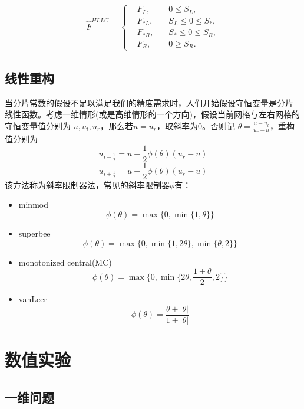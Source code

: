 \documentclass[a4paper,  11pt]{ctexart}
\begin{document}
\begin{itemize}
    \begin{align*}
      \hat{F}^{HLLC}=\left\{
      \begin{aligned}
        &F_L,\quad &0\leq S_L, \\
        &F_{*L},\quad &S_L\leq 0 \leq S_*,\\
        &F_{*R},\quad &S_*\leq 0 \leq S_R,\\
        &F_R,\quad &0\geq S_R.
      \end{aligned}
      \right.
    \end{align*}
\end{itemize}
\subsection{线性重构}
当分片常数的假设不足以满足我们的精度需求时，人们开始假设守恒变量是分片
线性函数。考虑一维情形(或是高维情形的一个方向)，假设当前网格与左右网格的守恒变量值分别为
$u,u_l,u_r$，那么若$u=u_r$，取斜率为0。否则记
$\theta=\frac{u-u_l}{u_r-u}$，重构值分别为
$$u_{i-\frac 12} = u - \frac 12\phi(\theta)(u_r-u)$$
$$u_{i+\frac 12} = u + \frac 12\phi(\theta)(u_r-u)$$
该方法称为斜率限制器法，常见的斜率限制器$\phi$有：
\begin{itemize}
  \item minmod
    \[  
      \phi(\theta) = \max\{0,\min\{1,\theta\}\}
    \]
  \item superbee
    \[  
    \phi(\theta) = \max\{0,\min\{1,2\theta\},\min\{\theta,2\}\}
    \]
  \item monotonized central(MC) 
    \[  
    \phi(\theta) = \max\{0,\min\{2\theta,\frac{1+\theta}{2},2\}\}
    \]
  \item vanLeer
    \[  
    \phi(\theta) = \frac{\theta+|\theta|}{1+|\theta|}
    \]
\end{itemize}


\section{数值实验}
\subsection{一维问题}
\end{document}

